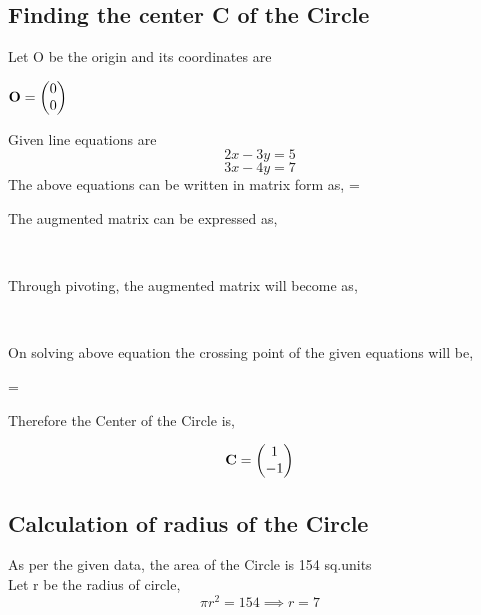 \documentclass[journal,10pt,twocolumn]{article}
\begin{document}
\subsection{Finding the center C of the Circle}
\begin{flushleft}
Let O be the origin and its coordinates are\\
\vspace{0.25cm}
\begin{center}
$\mathbf{O} = \begin{pmatrix}0\\0\end{pmatrix}$ 
\end{center}
Given line equations are
\begin{equation}
2x-3y = 5  
\end{equation}
\begin{equation}
3x-4y = 7  
\end{equation}
The above equations can be written in matrix form as,
\center
{}  =  \\
\vspace{0.3cm}
\begin{flushleft}
The augmented matrix can be expressed as,
\end{flushleft}
 \\
\begin{flushleft}
Through pivoting, the augmented matrix will become as,
\end{flushleft}
 \\
\begin{flushleft}
On solving above equation the crossing point of the given equations will be,\\
\end{flushleft}
= 
\endcenter
\begin{flushleft}
Therefore the Center of the Circle is,\\
\end{flushleft}
\begin{equation}
    \mathbf{C} = \begin{pmatrix}1\\-1\end{pmatrix}
\end{equation}
\end{flushleft}
\subsection{Calculation of radius of the Circle}
As per the given data, the area of the Circle is 154 sq.units\\
Let r be the radius of circle,\\
\begin{equation}
\pi r^2 = 154 \implies r = 7
\end{equation}
\end{document}
